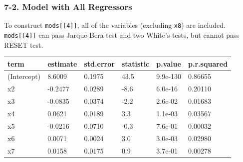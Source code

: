 \documentclass[a4paper]{article}
\begin{document}
\hypertarget{model-with-all-regressors}{%
\subsubsection{7-2. Model with All
Regressors}\label{model-with-all-regressors}}

To construct \texttt{mods{[}{[}4{]}{]}}, all of the variables (excluding
\texttt{x8}) are included. \texttt{mods{[}{[}4{]}{]}} can pass
Jarque-Bera test and two White's tests, but cannot pass RESET test.

\begin{table}[H]
\centering
\begin{tabular}{llllll}
\toprule
term & estimate & std.error & statistic & p.value & p.r.squared\\
\midrule
(Intercept) & 8.6009 & 0.1975 & 43.5 & 9.9e-130 & 0.86655\\
x2 & -0.2477 & 0.0289 & -8.6 & 6.0e-16 & 0.20110\\
x3 & -0.0835 & 0.0374 & -2.2 & 2.6e-02 & 0.01683\\
x4 & 0.0621 & 0.0189 & 3.3 & 1.1e-03 & 0.03567\\
x5 & -0.0216 & 0.0710 & -0.3 & 7.6e-01 & 0.00032\\
x6 & 0.0071 & 0.0024 & 3.0 & 3.0e-03 & 0.02980\\
x7 & 0.0158 & 0.0175 & 0.9 & 3.7e-01 & 0.00278\\
\bottomrule
\end{tabular}
\end{table}
\end{document}
